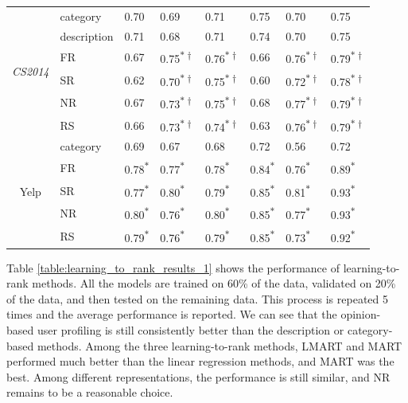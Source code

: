\begin{table}[t]
\begin{tabular}{ |c|l|lll|lll| }
\multirow{6}{*}{\em CS2014} & category & 0.70 & 0.69 & 0.71 & 0.75 & 0.70 & 0.75 \\
 & description & 0.71 & 0.68 & 0.71 & 0.74 & 0.70 & 0.75 \\  \cline{2-8}
 & FR & 0.67 & 0.75\textsuperscript{$\ast \dagger$} & 0.76\textsuperscript{$\ast \dagger$} & 0.66 & 0.76\textsuperscript{$\ast \dagger$} & 0.79\textsuperscript{$\ast \dagger$} \\
 & SR & 0.62 & 0.70\textsuperscript{$\ast \dagger$} & 0.75\textsuperscript{$\ast \dagger$} & 0.60 & 0.72\textsuperscript{$\ast \dagger$} & 0.78\textsuperscript{$\ast \dagger$} \\
 & NR & 0.67 & 0.73\textsuperscript{$\ast \dagger$} & 0.75\textsuperscript{$\ast \dagger$} & 0.68 & 0.77\textsuperscript{$\ast \dagger$} & 0.79\textsuperscript{$\ast \dagger$} \\
 & RS & 0.66 & 0.73\textsuperscript{$\ast \dagger$} & 0.74\textsuperscript{$\ast \dagger$} & 0.63 & 0.76\textsuperscript{$\ast \dagger$} & 0.79\textsuperscript{$\ast \dagger$} \\
 \hline
\hline

\multirow{5}{*}{Yelp} & category & 0.69 & 0.67 & 0.68 & 0.72 & 0.56 & 0.72 \\  \cline{2-8}
 & FR & 0.78\textsuperscript{$\ast$} & 0.77\textsuperscript{$\ast$} & 0.78\textsuperscript{$\ast$} & 0.84\textsuperscript{$\ast$} & 0.76\textsuperscript{$\ast$} & 0.89\textsuperscript{$\ast$} \\
 & SR & 0.77\textsuperscript{$\ast$} & 0.80\textsuperscript{$\ast$} & 0.79\textsuperscript{$\ast$} & 0.85\textsuperscript{$\ast$} & 0.81\textsuperscript{$\ast$} & 0.93\textsuperscript{$\ast$} \\
  & NR & 0.80\textsuperscript{$\ast$} & 0.76\textsuperscript{$\ast$} & 0.80\textsuperscript{$\ast$} & 0.85\textsuperscript{$\ast$} & 0.77\textsuperscript{$\ast$} & 0.93\textsuperscript{$\ast$} \\
 & RS & 0.79\textsuperscript{$\ast$} & 0.76\textsuperscript{$\ast$} & 0.79\textsuperscript{$\ast$} & 0.85\textsuperscript{$\ast$} & 0.73\textsuperscript{$\ast$} & 0.92\textsuperscript{$\ast$} \\

\hline

\end{tabular}
\end{table}


Table \ref{table:learning_to_rank_results_1} shows the performance of 
learning-to-rank methods.
All the models are trained on 60\% of the data, validated on 20\% of the data, 
and then tested on the remaining data.  
This process is repeated 5 times and the average performance is
reported. We can see that the opinion-based user profiling is still 
consistently better than the description or category-based methods.
Among the three learning-to-rank methods, 
LMART and MART performed much better than the linear regression methods, 
and MART was the best. Among different representations,
the performance is still similar, and NR remains to be a reasonable choice.

